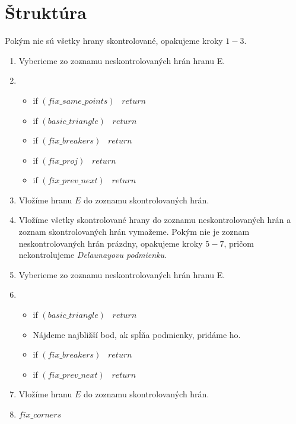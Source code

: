 \section{Štruktúra}

Pokým nie sú všetky hrany skontrolované, opakujeme kroky $1-3$.
\begin{enumerate}
    \item{
        Vyberieme zo zoznamu neskontrolovaných hrán hranu E.
    }
    \item{
        \begin{itemize}
            \item{
                if $(fix\_same\_points)$ \, $return$
            }
            \item{
                if $(basic\_triangle)$ \, $return$
            }
            \item{
                if $(fix\_breakers)$ \, $return$
            }
            \item{
                if $(fix\_proj)$ \, $return$
            }
            \item{
                if $(fix\_prev\_next)$ \, $return$
            }
        \end{itemize}
    }
    \item{
        Vložíme hranu $E$ do zoznamu skontrolovaných hrán.
    }
    \item{
        Vložíme všetky skontrolované hrany do zoznamu neskontrolovaných hrán a 
        zoznam skontrolovaných hrán vymažeme. Pokým nie je zoznam neskontrolovaných hrán prázdny,
        opakujeme kroky $5-7$, pričom nekontrolujeme \textit{Delaunayovu podmienku}.
    }
    \item{
        Vyberieme zo zoznamu neskontrolovaných hrán hranu E.
    }
    \item{
        \begin{itemize}
            \item{
                if $(basic\_triangle)$ \, $return$
            }
            \item{
                Nájdeme najbližší bod, ak spĺňa podmienky, pridáme ho.
            }
            \item{
                if $(fix\_breakers)$ \, $return$
            }
            \item{
                if $(fix\_prev\_next)$ \, $return$
            }
        \end{itemize}
    }
    \item{
        Vložíme hranu $E$ do zoznamu skontrolovaných hrán.
    }
    \item{
        $fix\_corners$
    }
\end{enumerate}

